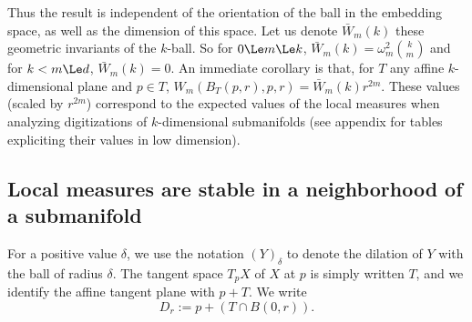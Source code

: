 Thus the result is independent of the orientation of the ball in the
embedding space, as well as the dimension of this space. Let us denote
$\bar{W}_{m}(k)$ these geometric invariants of the $k$-ball. So for $0
\Le m \Le k$, $\bar{W}_{m}(k)=\omega_m^2\binom{k}{m}$ and for $k < m
\Le d$, $\bar{W}_{m}(k)=0$.  An immediate corollary is that, for $T$
any affine $k$-dimensional plane and $p \in T$, $W_m( B_T(p,r),p,r) =
\bar{W}_{m}(k) r^{2m}$.  These values (scaled by $r^{2m}$) correspond
to the expected values of the local measures when analyzing
digitizations of $k$-dimensional submanifolds (see appendix for tables
expliciting their values in low dimension).





\subsection{Local measures are stable in a neighborhood of a submanifold}

For a positive value $\delta$, we use the notation $(Y)_\delta$ to
denote the dilation of $Y$ with the ball of radius $\delta$. The tangent
space $T_pX$ of $X$ at $p$ is simply written $T$, and we identify the
affine tangent plane with $p+T$. We write
\[
  D_r:=p+(T\cap B(0,r)).
\]

